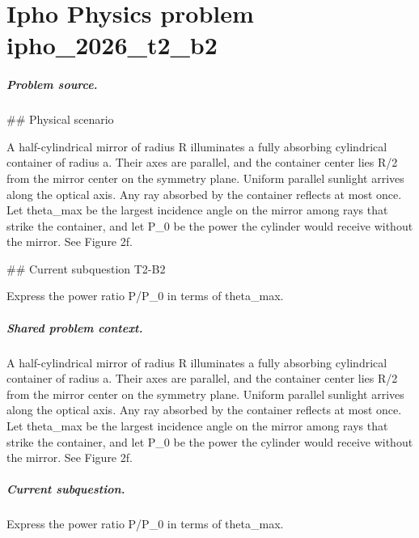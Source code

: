 
\chapter{Ipho Physics problem ipho\_2026\_t2\_b2}
\label{ch:IPhO2026Problems_problem_ipho_2026_t2_b2}

\paragraph{Problem source.}
\#\# Physical scenario

A half-cylindrical mirror of radius R illuminates a fully absorbing cylindrical
container of radius a.  Their axes are parallel, and the container center lies
R/2 from the mirror center on the symmetry plane.  Uniform parallel sunlight
arrives along the optical axis.  Any ray absorbed by the container reflects at
most once.  Let theta\_max be the largest incidence angle on the mirror among
rays that strike the container, and let P\_0 be the power the cylinder would
receive without the mirror.  See Figure 2f.

\#\# Current subquestion T2-B2

Express the power ratio P/P\_0 in terms of theta\_max.

\paragraph{Shared problem context.}
A half-cylindrical mirror of radius R illuminates a fully absorbing cylindrical
container of radius a.  Their axes are parallel, and the container center lies
R/2 from the mirror center on the symmetry plane.  Uniform parallel sunlight
arrives along the optical axis.  Any ray absorbed by the container reflects at
most once.  Let theta\_max be the largest incidence angle on the mirror among
rays that strike the container, and let P\_0 be the power the cylinder would
receive without the mirror.  See Figure 2f.

\paragraph{Current subquestion.}
Express the power ratio P/P\_0 in terms of theta\_max.

